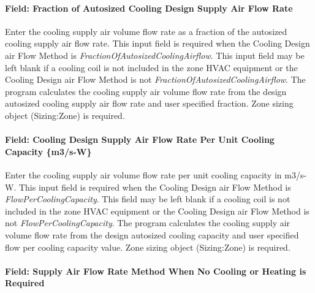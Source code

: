 \paragraph{Field: Fraction of Autosized Cooling Design Supply Air Flow Rate}\label{field-fraction-of-autosized-cooling-design-supply-air-flow-rate}

Enter the cooling supply air volume flow rate as a fraction of the autosized cooling supply air flow rate. This input field is required when the Cooling Design air Flow Method is \emph{FractionOfAutosizedCoolingAirflow}. This input field may be left blank if a cooling coil is not included in the zone HVAC equipment or the Cooling Design air Flow Method is not \emph{FractionOfAutosizedCoolingAirflow}. The program calculates the cooling supply air volume flow rate from the design autosized cooling supply air flow rate and user specified fraction. Zone sizing object (Sizing:Zone) is required.

\paragraph{Field: Cooling Design Supply Air Flow Rate Per Unit Cooling Capacity \{m3/s-W\}}\label{field-cooling-design-supply-air-flow-rate-per-unit-cooling-capacity-m3s-w}

Enter the cooling supply air volume flow rate per unit cooling capacity in m3/s-W. This input field is required when the Cooling Design air Flow Method is \emph{FlowPerCoolingCapacity}. This field may be left blank if a cooling coil is not included in the zone HVAC equipment or the Cooling Design air Flow Method is not \emph{FlowPerCoolingCapacity}. The program calculates the cooling supply air volume flow rate from the design autosized cooling capacity and user specified flow per cooling capacity value. Zone sizing object (Sizing:Zone) is required.

\paragraph{Field: Supply Air Flow Rate Method When No Cooling or Heating is Required}\label{field-supply-air-flow-rate-method-when-no-cooling-or-heating-is-required}

